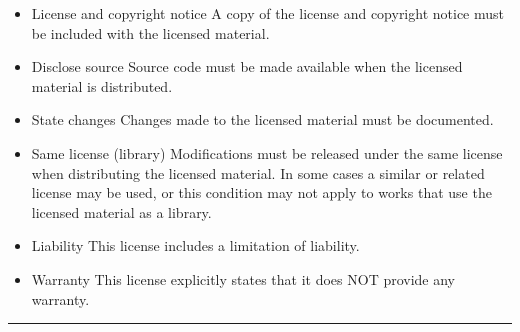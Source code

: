 \documentclass[letterpaper,10pt,english]{sphinxmanual}
\begin{document}
\begin{itemize}
\item {}
License and copyright notice \textendash{} A copy of the license and copyright notice must be included with the licensed material.

\item {}
Disclose source \textendash{} Source code must be made available when the licensed material is distributed.

\item {}
State changes \textendash{} Changes made to the licensed material must be documented.

\item {}
Same license (library) \textendash{} Modifications must be released under the same license when distributing the licensed material. In some cases a similar or related license may be used, or this condition may not apply to works that use the licensed material as a library.

\end{itemize}

\vspace{10px}

\begin{itemize}
\item {}
Liability \textendash{} This license includes a limitation of liability.

\item {}
Warranty \textendash{} This license explicitly states that it does NOT provide any warranty.

\end{itemize}

\begin{flushright}



\end{flushright}


\bigskip\hrule\bigskip
\end{document}
